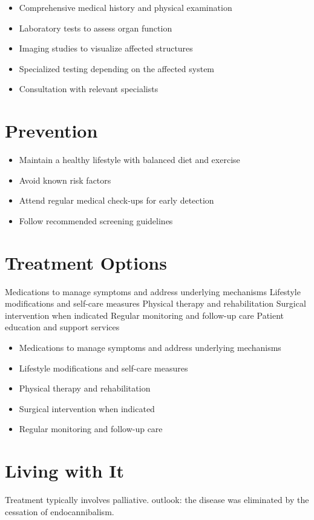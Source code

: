 \begin{itemize}[noitemsep]
  \item Comprehensive medical history and physical examination
  \item Laboratory tests to assess organ function
  \item Imaging studies to visualize affected structures
  \item Specialized testing depending on the affected system
  \item Consultation with relevant specialists
\end{itemize}
\section{Prevention}
\begin{itemize}[noitemsep]
  \item Maintain a healthy lifestyle with balanced diet and exercise
  \item Avoid known risk factors
  \item Attend regular medical check-ups for early detection
  \item Follow recommended screening guidelines
\end{itemize}
\section{Treatment Options}
Medications to manage symptoms and address underlying mechanisms Lifestyle modifications and self-care measures Physical therapy and rehabilitation Surgical intervention when indicated Regular monitoring and follow-up care Patient education and support services

\begin{itemize}[noitemsep]
  \item Medications to manage symptoms and address underlying mechanisms
  \item Lifestyle modifications and self-care measures
  \item Physical therapy and rehabilitation
  \item Surgical intervention when indicated
  \item Regular monitoring and follow-up care
\end{itemize}
\section{Living with It}
Treatment typically involves palliative. outlook: the disease was eliminated by the cessation of endocannibalism.

